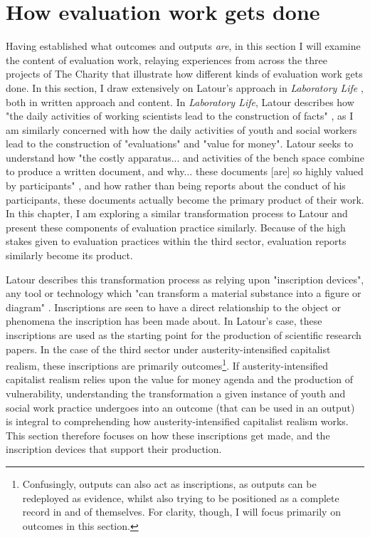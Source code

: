 \section{How evaluation work gets done}
\label{sec: 6-4-eval-work}
Having established what outcomes and outputs \emph{are}, in this section I will examine the content of evaluation work, relaying experiences from across the three projects of The Charity that illustrate how different kinds of evaluation work gets done. In this section, I draw extensively on Latour's approach in \emph{Laboratory Life} \citep{latour_laboratory_1986}, both in written approach and content. In \emph{Laboratory Life}, Latour describes how "the daily activities of working scientists lead to the construction of facts" \citep[p. 40]{latour_laboratory_1986}, as I am similarly concerned with how the daily activities of youth and social workers lead to the construction of "evaluations" and "value for money". Latour seeks to understand how "the costly apparatus... and activities of the bench space combine to produce a written document, and why... these documents [are] so highly valued by participants" \citep[p. 48]{latour_laboratory_1986}, and how rather than being reports about the conduct of his participants, these documents actually become the primary product of their work. In this chapter, I am exploring a similar transformation process to Latour and present these components of evaluation practice similarly. Because of the high stakes given to evaluation practices within the third sector, evaluation reports similarly become its product. 

Latour describes this transformation process as relying upon "inscription devices", any tool or technology which "can transform a material substance into a figure or diagram" \citep[p. 51]{latour_laboratory_1986}. Inscriptions are seen to have a direct relationship to the object or phenomena the inscription has been made about. In Latour's case, these inscriptions are used as the starting point for the production of scientific research papers. In the case of the third sector under austerity-intensified capitalist realism, these inscriptions are primarily outcomes\footnote{Confusingly, outputs can also act as inscriptions, as outputs can be redeployed as evidence, whilst also trying to be positioned as a complete record in and of themselves. For clarity, though, I will focus primarily on outcomes in this section.}.  If austerity-intensified capitalist realism relies upon the value for money agenda and the production of vulnerability, understanding the transformation a given instance of  youth and social work practice undergoes into an outcome (that can be used in an output) is integral to comprehending how austerity-intensified capitalist realism works. This section therefore focuses on how  these inscriptions get made, and the inscription devices that support their production.

